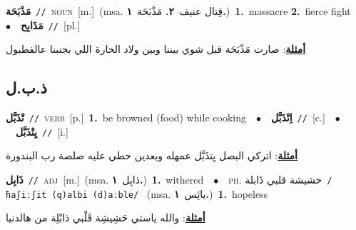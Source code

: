 \documentclass[10pt,a4paper,twoside]{article} %
\begin{document}
\begin{multicols}{2}
{\setlength\topsep{0pt}\textbf{\foreignlanguage{arabic}{مَذْبَحَة}}\ {\color{gray}\texttt{//}\color{black}}\ \textsc{noun}\ [m.]\ \color{gray}(msa. \foreignlanguage{arabic}{قِتال عنيف}~\foreignlanguage{arabic}{\textbf{٢.}}  \foreignlanguage{arabic}{مَذْبَحَة}~\foreignlanguage{arabic}{\textbf{١.}})\color{black}\ \textbf{1.}~massacre  \textbf{2.}~fierce fight\ \ $\bullet$\ \ \setlength\topsep{0pt}\textbf{\foreignlanguage{arabic}{مَذَابِح}}\ {\color{gray}\texttt{//}\color{black}}\ [pl.]\  \begin{flushright}\color{gray}\foreignlanguage{arabic}{\textbf{\underline{\foreignlanguage{arabic}{أمثلة}}}: صارت مَذْبَحَة قبل شوي بيننا وبين ولاد الحارة اللي بجنبنا عالفطبول}\end{flushright}\color{black}} \vspace{2mm}

\vspace{-3mm}
\subsection*{\color{blue}\foreignlanguage{arabic}{ذ.ب.ل}\color{blue}{}} 

{\setlength\topsep{0pt}\textbf{\foreignlanguage{arabic}{تْذَبَّل}}\ {\color{gray}\texttt{//}\color{black}}\ \textsc{verb}\ [p.]\ \textbf{1.}~be browned (food) while cooking\ \ $\bullet$\ \ \setlength\topsep{0pt}\textbf{\foreignlanguage{arabic}{اِتْذَبَّل}}\ {\color{gray}\texttt{//}\color{black}}\ [c.]\ \ $\bullet$\ \ \setlength\topsep{0pt}\textbf{\foreignlanguage{arabic}{يِتْذَبَّل}}\ {\color{gray}\texttt{//}\color{black}}\ [i.]\  \begin{flushright}\color{gray}\foreignlanguage{arabic}{\textbf{\underline{\foreignlanguage{arabic}{أمثلة}}}: اتركي البصل يِتذَبَّل عمهله وبعدين حطي عليه صلصة رب البندورة}\end{flushright}\color{black}} \vspace{2mm}

{\setlength\topsep{0pt}\textbf{\foreignlanguage{arabic}{ذَابِل}}\ {\color{gray}\texttt{//}\color{black}}\ \textsc{adj}\ [m.]\ \color{gray}(msa. \foreignlanguage{arabic}{ذابِل}~\foreignlanguage{arabic}{\textbf{١.}})\color{black}\ \textbf{1.}~withered\ \ $\bullet$\ \ \textsc{ph.} \color{gray} \foreignlanguage{arabic}{حشيشة قلبي ذَابلة}\color{black}\ {\color{gray}\texttt{/{\sffamily ħaʃiːʃit (q)albi (d)aːble}/}\color{black}}\ \color{gray} (msa. \foreignlanguage{arabic}{يائِس}~\foreignlanguage{arabic}{\textbf{١.}})\color{black}\ \textbf{1.}~hopeless\  \begin{flushright}\color{gray}\foreignlanguage{arabic}{\textbf{\underline{\foreignlanguage{arabic}{أمثلة}}}: والله ياستي حَشِيشِة قَلْبي ذابْلِة من هالدنيا}\end{flushright}\color{black}} \vspace{2mm}


\end{multicols}
\end{document}
